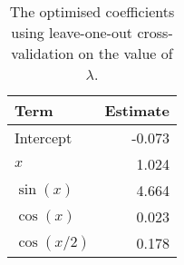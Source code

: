 \begin{table}[t]

\caption{\label{tab:lasso-coefs}The optimised coefficients using leave-one-out cross-validation on the value of \(\lambda\).}
\centering
\begin{tabular}{lr}
\toprule
Term & Estimate\\
\midrule
Intercept & -0.073\\
\(x\) & 1.024\\
\(\sin(x)\) & 4.664\\
\(\cos(x)\) & 0.023\\
\(\cos(x/2)\) & 0.178\\
\bottomrule
\end{tabular}
\end{table}